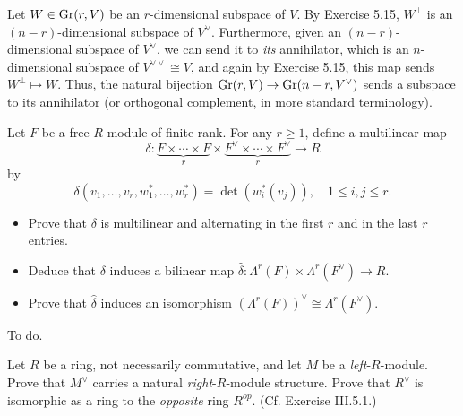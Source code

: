 \documentclass[../../master.tex]{subfiles}
\begin{document}
\begin{solution}
    Let $W \in \operatorname{Gr}(r, V)$ be an $r$-dimensional subspace of $V$.
    By Exercise 5.15, $W^{\perp}$ is an $(n-r)$-dimensional subspace of $V^{\vee}$.
    Furthermore, given an $(n-r)$-dimensional subspace of $V^{\vee}$, we can send it to \textit{its} annihilator, which is an $n$-dimensional subspace of $V^{\vee \vee} \cong V$, and again by Exercise 5.15, this map sends $W^{\perp} \mapsto W$.
    Thus, the natural bijection $\operatorname{Gr}(r, V) \to \operatorname{Gr}(n-r, V^{\vee})$ sends a subspace to its annihilator (or orthogonal complement, in more standard terminology).
\end{solution}

\begin{problem}
    Let $F$ be a free $R$-module of finite rank.
    For any $r \geq 1$, define a multilinear map
    \[
        \delta : \underbrace{F \times \cdots \times F}_{r} \times \underbrace{F^{\vee} \times \cdots \times F^{\vee}}_{r} \to R
    \]
    by
    \[
    \delta(v_1, \ldots, v_r, w_1^{*}, \ldots, w_r^{*}) = \det(w_i^{*}(v_j)), \quad 1 \leq i, j \leq r.
    \]
    \begin{itemize}
        \item Prove that $\delta$ is multilinear and alternating in the first $r$ and in the last $r$ entries.
        \item Deduce that $\delta$ induces a bilinear map $\hat{\delta} : \Lambda^{r}(F) \times \Lambda^{r}(F^{\vee}) \to R$.
        \item Prove that $\hat{\delta}$ induces an isomorphism $(\Lambda^{r}(F))^{\vee} \cong \Lambda^{r}(F^{\vee})$.
    \end{itemize}
\end{problem}

\begin{solution}
    To do.
\end{solution}

\begin{problem}
    Let $R$ be a ring, not necessarily commutative, and let $M$ be a \textit{left}-$R$-module.
    Prove that $M^{\vee}$ carries a natural \textit{right}-$R$-module structure.
    Prove that $R^{\vee}$ is isomorphic as a ring to the \textit{opposite} ring $R^{op}$.
    (Cf. Exercise III.5.1.)
\end{problem}
\end{document}
